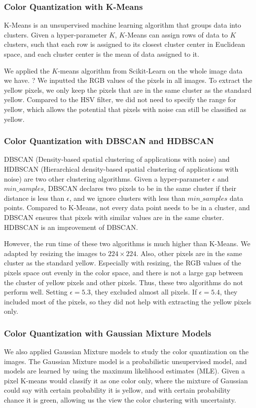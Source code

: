 \documentclass{m2pi}
\begin{document}
\subsubsection{Color Quantization with K-Means}

K-Means is an unsupervised machine learning algorithm that groups data into clusters. Given a hyper-parameter $K$, $K$-Means can assign rows of data to $K$ clusters, such that each row is assigned to its closest cluster center in Euclidean space, and each cluster center is the mean of data assigned to it.

We applied the $K$-means algorithm from Scikit-Learn 
{\color{red} on the whole image data we have. ?} 
We inputted the RGB values of the pixels in all images. To extract the yellow pixels, we only keep the pixels that are in the same cluster as the standard yellow. Compared to the HSV filter, we did not need to specify the range for yellow, which allows the potential that pixels with noise can still be classified as yellow.


\subsubsection{Color Quantization with DBSCAN and HDBSCAN}

DBSCAN (Density-based spatial clustering of applications with noise) and HDBSCAN (Hierarchical density-based spatial clustering of applications with noise) are two other clustering algorithms. Given a hyper-parameter $\epsilon$ and $min\_samples$, DBSCAN declares two pixels to be in the same cluster if their distance is less than $\epsilon$, and we ignore clusters with less than $min\_samples$ data points. Compared to K-Means, not every data point needs to be in a cluster, and DBSCAN ensures that pixels with similar values are in the same cluster. HDBSCAN is an improvement of DBSCAN.

However, the run time of these two algorithms is much higher than K-Means. We adapted by resizing the images to $224 \times 224$. Also, other pixels are in the same cluster as the standard yellow. Especially with resizing, the RGB values of the pixels space out evenly in the color space, and there is not a large gap between the cluster of yellow pixels and other pixels. Thus, these two algorithms do not perform well. Setting $\epsilon=5.3$, they excluded almost all pixels. If $\epsilon=5.4$, they included most of the pixels, so they did not help with extracting the yellow pixels only.

\subsubsection{Color Quantization with Gaussian Mixture Models}
 We also applied Gaussian Mixture models to study the color quantization on the images. The Gaussian Mixture model is a probabilistic unsupervised model, and models are learned by using the maximum likelihood estimates (MLE).  Given a pixel K-means would classify it as one color only, where the mixture of Gaussian could say with certain probability it is yellow, and with certain probability chance it is green, allowing us the view the color clustering with uncertainty. 
\end{document}
